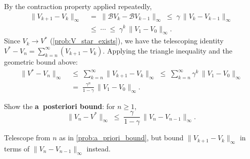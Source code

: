 \documentclass[11pt]{article}
\begin{document}
\begin{solution}
By the contraction property applied repeatedly,
\begin{align*}
\|V_{k+1} - V_k\|_\infty \;&=\; \|\mathcal{B} V_k - \mathcal{B} V_{k-1}\|_\infty \;\le\; \gamma\, \|V_k - V_{k-1}\|_\infty \\
&\le\; \cdots \;\le\; \gamma^k\, \|V_1 - V_0\|_\infty.
\end{align*}
Since $V_k \to V^*$ (\cref{prob:V_star_exists}), we have the telescoping identity $V^* - V_n = \sum_{k=n}^{\infty}(V_{k+1} - V_k)$. Applying the triangle inequality and the geometric bound above:
\begin{align*}
\|V^* - V_n\|_\infty \;&\le\; \sum_{k=n}^{\infty} \|V_{k+1} - V_k\|_\infty \;\le\; \sum_{k=n}^{\infty} \gamma^k\, \|V_1 - V_0\|_\infty \\
&=\; \frac{\gamma^n}{1-\gamma}\, \|V_1 - V_0\|_\infty.
\end{align*}
\end{solution}

\begin{exercise}
\label{prob:a_posteriori_bound} Show the \textbf{a~posteriori bound}: for $n \ge 1$,
$$
\|V_n - V^*\|_\infty \;\le\; \frac{\gamma}{1-\gamma}\, \|V_n - V_{n-1}\|_\infty.
$$

\begin{hint}
Telescope from $n$ as in \cref{prob:a_priori_bound}, but bound $\|V_{k+1} - V_k\|_\infty$ in terms of $\|V_n - V_{n-1}\|_\infty$ instead.
\end{hint}
\end{exercise}
\end{document}
